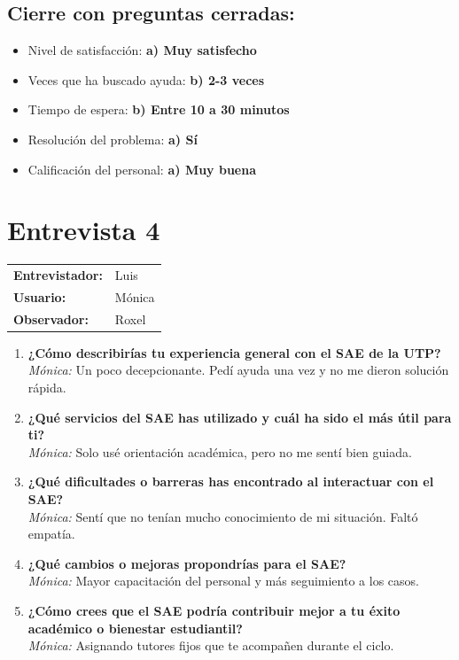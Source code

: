\documentclass{article}
\begin{document}
\subsection*{Cierre con preguntas cerradas:}
\begin{itemize}
    \item Nivel de satisfacción: \textbf{a) Muy satisfecho}
    \item Veces que ha buscado ayuda: \textbf{b) 2-3 veces}
    \item Tiempo de espera: \textbf{b) Entre 10 a 30 minutos}
    \item Resolución del problema: \textbf{a) Sí}
    \item Calificación del personal: \textbf{a) Muy buena}
\end{itemize}

\section*{Entrevista 4}
\begin{tabular}{ll}
\textbf{Entrevistador:} & Luis \\
\textbf{Usuario:} & Mónica \\
\textbf{Observador:} & Roxel \\
\end{tabular}
\vspace{-0.5cm}
\begin{enumerate}[leftmargin=*, label=\textbf{\arabic*.}]
    \item \textbf{¿Cómo describirías tu experiencia general con el SAE de la UTP?} \\
    \textcolor{responsegray}{\textit{Mónica:} Un poco decepcionante. Pedí ayuda una vez y no me dieron solución rápida.}
    
    \item \textbf{¿Qué servicios del SAE has utilizado y cuál ha sido el más útil para ti?} \\
    \textcolor{responsegray}{\textit{Mónica:} Solo usé orientación académica, pero no me sentí bien guiada.}
    
    \item \textbf{¿Qué dificultades o barreras has encontrado al interactuar con el SAE?} \\
    \textcolor{responsegray}{\textit{Mónica:} Sentí que no tenían mucho conocimiento de mi situación. Faltó empatía.}
    
    \item \textbf{¿Qué cambios o mejoras propondrías para el SAE?} \\
    \textcolor{responsegray}{\textit{Mónica:} Mayor capacitación del personal y más seguimiento a los casos.}
    
    \item \textbf{¿Cómo crees que el SAE podría contribuir mejor a tu éxito académico o bienestar estudiantil?} \\
    \textcolor{responsegray}{\textit{Mónica:} Asignando tutores fijos que te acompañen durante el ciclo.}
\end{enumerate}
\end{document}
